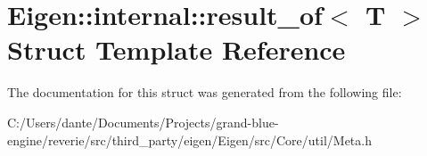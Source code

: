 \hypertarget{struct_eigen_1_1internal_1_1result__of}{}\section{Eigen\+::internal\+::result\+\_\+of$<$ T $>$ Struct Template Reference}
\label{struct_eigen_1_1internal_1_1result__of}


The documentation for this struct was generated from the following file\+:\begin{DoxyCompactItemize}
\item 
C\+:/\+Users/dante/\+Documents/\+Projects/grand-\/blue-\/engine/reverie/src/third\+\_\+party/eigen/\+Eigen/src/\+Core/util/Meta.\+h\end{DoxyCompactItemize}
